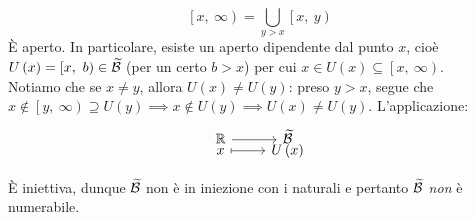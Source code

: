 \begin{example}
\begin{itemize}
\begin{equation*}
\left[x,\ \infty\right)=\bigcup_{y>x}\left[x,\ y\right)
\end{equation*}
È aperto. In particolare, esiste un aperto dipendente dal punto $x$, cioè $U\left(x\right)=\left[x,\ b\right)\in\widetilde{\basis}$ (per un certo $b>x$) per cui $x\in U\left(x\right)\subseteq\left[x,\ \infty\right)$.\\
Notiamo che se $x\neq y$, allora $U\left(x\right)\neq U\left(y\right)$: preso $y>x$, segue che $x\notin \left[y,\ \infty\right)\supseteq U\left(y\right)\implies x\notin U\left(y\right)\implies U\left(x\right)\neq U\left(y\right)$. L'applicazione:
\begin{equation}
\funztot{\ }{\realset}{\widetilde{\basis}}{x}{U\left(x\right)}
\end{equation}
\end{itemize}
È iniettiva, dunque $\widetilde{\mathcal{B}}$ non è in iniezione con i naturali e pertanto $\widetilde{\mathcal{B}}$ \textit{non} è numerabile.
\end{example}
\begin{center}
\end{center}
